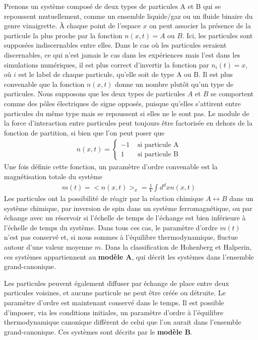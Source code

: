 Prenons un système composé de deux types de particules A et B qui se repoussent mutuellement, comme un ensemble liquide/gaz ou un fluide binaire du genre vinaigrette. À chaque point de l'espace $x$ on peut associer la présence de la particule la plus proche par la fonction $n(x,t) = A \text{ ou } B$. Ici, les particules sont supposées indiscernables entre elles. Dans le cas où les particules seraient discernables, ce qui n'est jamais le cas dans les expériences mais l'est dans les simulations numériques, il est plus correct d'invertir la fonction par $n_i(t) = x$, où $i$ est le label de chaque particule, qu'elle soit de type A ou B. 
Il est plus convenable que la fonction $n(x,t)$ donne un nombre plutôt qu'un type de particules. Nous supposons que les deux types de particules $A$ et $B$ se comportent comme des pôles électriques de signe opposés, puisque qu'elles s'attirent entre particules du même type mais se repoussent si elles ne le sont pas. Le module de la force d'interaction entre particules peut toujours être factorisée en dehors de la fonction de partition, si bien que l'on peut poser que
\begin{align}
    n(x,t) = \begin{cases} -1 &\text{ si particule A} \\ 1 &\text{ si particule B}  \end{cases}
\end{align}
Une fois définie cette fonction, un paramètre d'ordre convenable est la magnétisation totale du système
\begin{align}
    m(t) = <n(x,t)>_x = \frac{1}{V} \int d^dx  n(x,t)
\end{align}
Les particules ont la possibilité de réagir par la réaction chimique $A \leftrightarrow B$ dans un système chimique, par inversion de spin dans un système ferromagnétique, ou par échange avec un réservoir si l'échelle de temps de l'échange est bien inférieure à l'échelle de temps du système. Dans tous ces cas, le paramètre d'ordre $m(t)$ n'est pas conservé et, si nous sommes à l'équilibre thermodynamique, fluctue autour d'une valeur moyenne $m$.  Dans la classification de Hohenberg et Halperin\cite{hohenberg_theory_1977}, ces systèmes appartiennent au \textbf{modèle A}, qui décrit les systèmes dans l'ensemble grand-canonique.

Les particules peuvent également diffuser par échange de place entre deux particules voisines, et aucune particule ne peut être créée ou détruite. Le paramètre d'ordre est maintenant conservé dans le temps. Il est possible d'imposer, via les conditions initiales, un paramètre d'ordre à l'équilibre thermodynamique canonique différent de celui que l'on aurait dans l'ensemble grand-canonique. Ces systèmes sont décrits par le \textbf{modèle B}.

